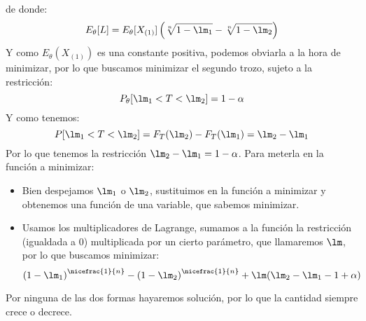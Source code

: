 \begin{ejercicio}
    de donde:
    \begin{equation*}
        E_\theta[L] = E_\theta[X_{(1)}]\left(\sqrt[n]{1-\lm_1} - \sqrt[n]{1-\lm_2}\right)
    \end{equation*}
    Y como $E_\theta(X_{(1)})$ es una constante positiva, podemos obviarla a la hora de minimizar, por lo que buscamos minimizar el segundo trozo, sujeto a la restricción:
    \begin{equation*}
        P_\theta[\lm_1 < T < \lm_2] = 1-\alpha
    \end{equation*}
    Y como tenemos:
    \begin{equation*}
        P[\lm_1 < T < \lm_2] = F_T(\lm_2) - F_T(\lm_1) = \lm_2 - \lm_1
    \end{equation*}
    Por lo que tenemos la restricción $\lm_2-\lm_1 = 1-\alpha$. Para meterla en la función a minimizar:
    \begin{itemize}
        \item Bien despejamos $\lm_1$ o $\lm_2$, sustituimos en la función a minimizar y obtenemos una función de una variable, que sabemos minimizar.
        \item Usamos los multiplicadores de Lagrange, sumamos a la función la restricción (igualdada a 0) multiplicada por un cierto parámetro, que llamaremos $\lm$, por lo que buscamos minimizar:
            \begin{equation*}
                {(1-\lm_1)}^{\nicefrac{1}{n}}- {(1-\lm_2)}^{\nicefrac{1}{n}} + \lm (\lm_2 - \lm_1 - 1+\alpha)
            \end{equation*}
    \end{itemize}
    Por ninguna de las dos formas hayaremos solución, por lo que la cantidad siempre crece o decrece. %
\end{ejercicio}

